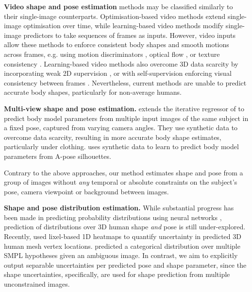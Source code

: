 \documentclass[final]{cvpr}
\begin{document}
\noindent \textbf{Video shape and pose estimation} methods may be classified similarly to their single-image counterparts. Optimisation-based video methods \cite{Arnab_CVPR_2019, MuVS:3DV:2017, alldieck2017optical} extend single-image optimisation over time, while learning-based video methods \cite{humanMotionKanazawa19, kocabas2019vibe, sun2019dsd-satn, NIPS2017_7108, pavlakos2019texturepose} modify single-image predictors to take sequences of frames as inputs. However, video inputs allow these methods to enforce consistent body shapes and smooth motions across frames, e.g. using motion discriminators \cite{movi2020}, optical flow \cite{alldieck2017optical, NIPS2017_7108}, or texture consistency \cite{pavlakos2019texturepose}. Learning-based video methods also overcome 3D data scarcity by incorporating weak 2D supervision \cite{kocabas2019vibe, humanMotionKanazawa19}, or with self-supervision enforcing visual consistency between frames \cite{NIPS2017_7108, pavlakos2019texturepose, alldieck2017optical}. Nevertheless, current methods are unable to predict accurate body shapes, particularly for non-average humans.

\noindent \textbf{Multi-view shape and pose estimation.} \cite{liang2019samv} extends the iterative regressor of \cite{hmrKanazawa17} to predict body model parameters from multiple input images of the same subject in a fixed pose, captured from varying camera angles. They use synthetic data to overcome data scarcity, resulting in more accurate body shape estimates, particularly under clothing. \cite{smith20193dfromsilhouettes} uses synthetic data to learn to predict body model parameters from A-pose silhouettes.

Contrary to the above approaches, our method estimates shape and pose from a group of images without \textit{any} temporal or absolute constraints on the subject's pose, camera viewpoint or background between images.

\noindent \textbf{Shape and pose distribution estimation.} While substantial progress has been made in predicting probability distributions using neural networks \cite{baum1988superviseddistribution, nix1994icnn, Bishop94mixturedensity, kendall2017whatuncertainties, rupprecht2017learning, prokudin2018deepdirectstat, li2019posemdn, mohlin2020matrixfisher}, prediction of distributions over 3D human shape \textit{and} pose is still under-explored. Recently, \cite{Moon_2020_ECCV_I2L-MeshNet} used lixel-based 1D heatmaps to quantify uncertainty in predicted 3D human mesh vertex locations. \cite{biggs2020multibodies} predicted a categorical distribution over multiple SMPL hypotheses given an ambiguous image. In contrast, we aim to explicitly output separable uncertainties per predicted pose and shape parameter, since the shape uncertainties, specifically, are used for shape prediction from multiple unconstrained images.
\end{document}
